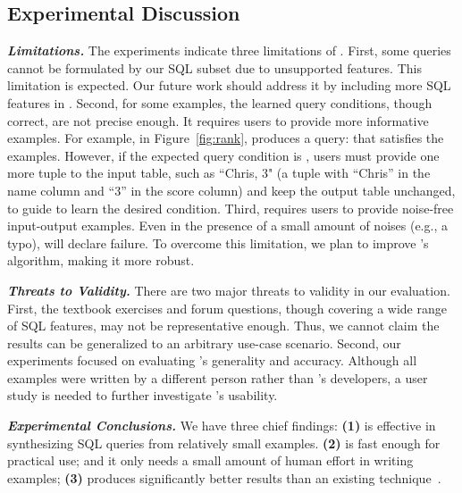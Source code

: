 \vspace{-1mm}
\subsection{Experimental Discussion}
\vspace{-1mm}

\enlargethispage{5pt}

\noindent \textbf{\textit{Limitations.}}
The experiments indicate three limitations
of \ourtool. First, some queries
cannot be formulated by our SQL subset
due to unsupported features. This limitation is expected.
Our future work
should address it by including more SQL
features in \ourtool.
Second, for some examples, the learned query
conditions, though correct, are not precise
enough. It requires users to provide more informative examples.
For example, in Figure~\ref{fig:rank}, \ourtool produces a 
query: 
that satisfies the examples. However, if
the expected query condition 
is , users must provide
one more tuple to the input table, such as ``Chris, 3"
(a tuple with ``Chris'' in the name column and ``3''
in the score column) and keep the output table
unchanged, 
to guide \ourtool to learn the desired condition.
Third, \ourtool requires
users to provide noise-free input-output examples.
Even in the presence of a small amount of 
noises (e.g., a typo), \ourtool will declare failure.
To overcome this limitation, we plan to improve \ourtool
's algorithm, making it more robust.

\vspace{.5mm}
\noindent \textbf{\textit{Threats to Validity.}}
There are two major threats to validity
in our evaluation. First, the \exnum textbook exercises
and \pnum forum questions, though covering
a wide range of SQL features, may not be representative enough.
Thus, we cannot claim the results can be generalized to an
arbitrary use-case scenario. Second, our
experiments focused on evaluating \ourtool's generality 
and accuracy. Although all examples were written
by a different person rather than \ourtool's developers,
a user study is needed to further investigate
\ourtool's usability.


\vspace{.5mm}
\noindent \textbf{\textit{Experimental Conclusions.}}
We have three chief findings: \textbf{(1)}
\ourtool is effective in synthesizing SQL queries
from relatively small examples.
\textbf{(2)} \ourtool is fast enough for practical use;
and it only needs a small amount of human
effort in writing examples;
\textbf{(3)} \ourtool produces significantly better results
than an existing technique~\cite{Tran:2009}.




